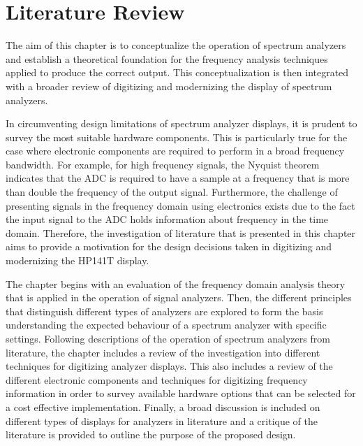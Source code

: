 \documentclass[class=report,11pt,crop=false]{standalone}
\begin{document}
\ifstandalone
\tableofcontents
\fi
\chapter{Literature Review \label{ch:literature}}
\vspace{0.25cm}
The aim of this chapter is to conceptualize the operation of spectrum analyzers and establish a theoretical foundation for the frequency analysis techniques applied to produce the correct output. This conceptualization is then integrated with a broader review of digitizing and modernizing the display of spectrum analyzers.

In circumventing design limitations of spectrum analyzer displays, it is prudent to survey the most suitable hardware components. This is particularly true for the case where electronic components are required to perform in a broad frequency bandwidth. For example, for high frequency signals, the Nyquist theorem indicates that the ADC is required to have a sample at a frequency that is more than double the frequency of the output signal. Furthermore, the challenge of presenting signals in the frequency domain using electronics exists due to the fact the input signal to the ADC holds information about frequency in the time domain. Therefore, the investigation of literature that is presented in this chapter aims to provide a motivation for the design decisions taken in digitizing and modernizing the HP141T display.

The chapter begins with an evaluation of the frequency domain analysis theory that is applied in the operation of signal analyzers. Then, the different principles that distinguish different types of analyzers are explored to form the basis understanding the expected behaviour of a spectrum analyzer with specific settings. Following descriptions of the operation of spectrum analyzers from literature, the chapter includes a review of the investigation into different techniques for digitizing analyzer displays. This also includes a review of the different electronic components and techniques for digitizing frequency information in order to survey available hardware options that can be selected for a cost effective implementation. Finally, a broad discussion is included on different types of displays for analyzers in literature and a critique of the literature is provided to outline the purpose of the proposed design. 
\end{document}
